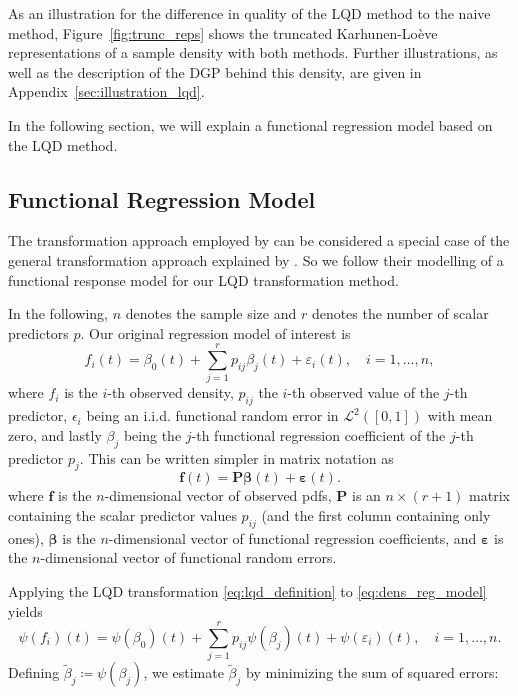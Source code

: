 As an illustration for the difference in quality of the LQD method to the naive method,
Figure~\ref{fig:trunc_reps} shows the truncated Karhunen-Loève representations of a
sample density with both methods. Further illustrations, as well as the description of the
DGP behind this density, are given in Appendix~\ref{sec:illustration_lqd}.

In the following section, we will explain a functional regression model based on the
LQD method.

\subsection{Functional Regression Model}
\label{sec:func_reg_model}
The transformation approach employed by \textcite{TalskaEtAl2018} can be considered a
special case of the general transformation approach explained by \textcite{PetersenMüller2016}
\parencite[cf.][]{PetersenZhangKokoszka2022}. So we follow their modelling of a functional
response model for our LQD transformation method.

In the following, $n$ denotes the sample size and $r$ denotes the number of scalar
predictors $p$. Our original regression model of interest is
\begin{equation}
    \label{eq:dens_reg_model}
    f_i(t) = \beta_0(t) + \sum_{j=1}^{r} p_{ij} \beta_j(t) + \varepsilon_i(t), \quad i = 1, \ldots, n,
\end{equation}
where $f_i$ is the $i$-th observed density, $p_{ij}$ the $i$-th observed value of the
$j$-th predictor, $\epsilon_i$ being an i.i.d. functional random error in $\mathcal{L}^2([0,1])$
with mean zero, and lastly $\beta_j$ being the $j$-th functional regression coefficient of the $j$-th
predictor $p_j$. This can be written simpler in matrix notation as
\begin{equation}
    \label{eq:dens_reg_model_matrix}
    \mathbf{f}(t) = \mathbf{P} \boldsymbol{\beta}(t) + \boldsymbol{\varepsilon}(t).
\end{equation}
where $\mathbf{f}$ is the $n$-dimensional vector of observed pdfs, $\mathbf{P}$ is an $n \times (r+1)$
matrix containing the scalar predictor values $p_{ij}$ (and the first column containing only
ones), $\boldsymbol{\beta}$ is the $n$-dimensional vector of functional regression coefficients,
and $\boldsymbol{\varepsilon}$ is the $n$-dimensional vector of functional random errors.

Applying the LQD transformation \eqref{eq:lqd_definition} to \eqref{eq:dens_reg_model}
yields
\begin{equation}
    \label{eq:lqd_reg_model}
    \psi(f_i)(t) = \psi(\beta_0)(t) + \sum_{j=1}^{r} p_{ij} \psi(\beta_j)(t) + \psi(\varepsilon_i)(t), \quad i = 1, \ldots, n.
\end{equation}
Defining $\tilde{\beta}_j \coloneqq \psi(\beta_j)$, we estimate $\tilde{\beta}_j$ by
minimizing the sum of squared errors:


